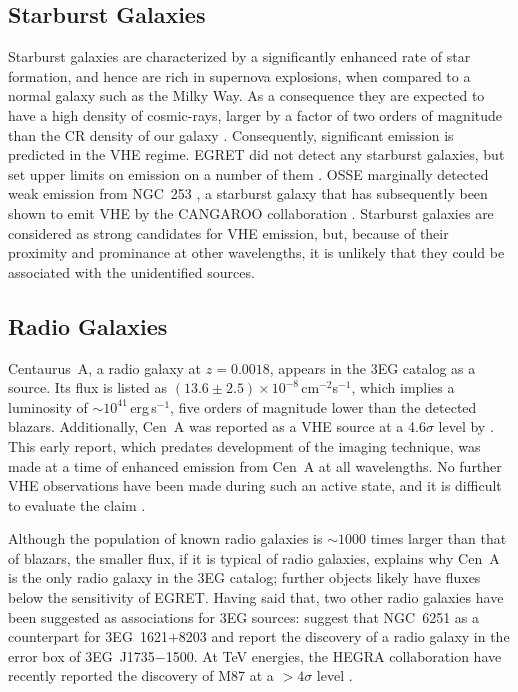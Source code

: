 \subsection{Starburst Galaxies}
\label{SEC::SOURCES::STARBURST}

Starburst galaxies are characterized by a significantly enhanced rate
of star formation, and hence are rich in supernova explosions, when
compared to a normal galaxy such as the Milky Way. As a consequence
they are expected to have a high density of cosmic-rays, larger by a
factor of two orders of magnitude than the CR density of our galaxy
\citep[see][]{REF::VOLK::UVGR2003}. Consequently, significant \Gray
emission is predicted in the VHE regime. EGRET did not detect any
starburst galaxies, but set upper limits on emission on a number of
them \citep{REF::BLOM::ALC1999}. OSSE marginally detected weak
emission from NGC~253 \citep{REF::BHATTACHARYA::APJ1994}, a starburst
galaxy that has subsequently been shown to emit VHE \Grays by the
CANGAROO collaboration \citep{REF::ITOH::AA2003}. Starburst galaxies
are considered as strong candidates for VHE emission, but, because of
their proximity and prominance at other wavelengths, it is unlikely
that they could be associated with the unidentified sources.

\subsection{Radio Galaxies}
\label{SEC::SOURCES::RADIOGAL}

Centaurus~A, a radio galaxy at $z=0.0018$, appears in the 3EG catalog
as a source. Its flux is listed as
$(13.6\pm2.5)\times10^{-8}$\,cm$^{-2}$s$^{-1}$, which implies a
luminosity of $\sim10^{41}$\,erg\,s$^{-1}$, five orders of magnitude
lower than the detected blazars. Additionally, Cen~A was reported as a
VHE source at a 4.6$\sigma$ level by \citet{REF::GRINDLAY::APJ1975}.
This early report, which predates development of the imaging
technique, was made at a time of enhanced emission from Cen~A at all
wavelengths. No further VHE observations have been made during such an
active state, and it is difficult to evaluate the claim
\citep[see for example][]{REF::CARRAMINANA::AA1990}.

Although the population of known radio galaxies is $\sim1000$ times
larger than that of blazars, the smaller flux, if it is typical of
radio galaxies, explains why Cen~A is the only radio galaxy in the 3EG
catalog; further objects likely have fluxes below the sensitivity of
EGRET. Having said that, two other radio galaxies have been suggested
as associations for 3EG sources: \citet{REF::MUKHERJEE::APJ2002}
suggest that NGC~6251 as a counterpart for 3EG~1621$+$8203 and
\citet{REF::COMBI::APJ2003} report the discovery of a radio galaxy in
the error box of 3EG~J1735$-$1500.  At TeV energies, the HEGRA
collaboration have recently reported the discovery of M87 at a
$>4\sigma$ level \citep{REF::AHARONIAN::AA2003::M87}.

